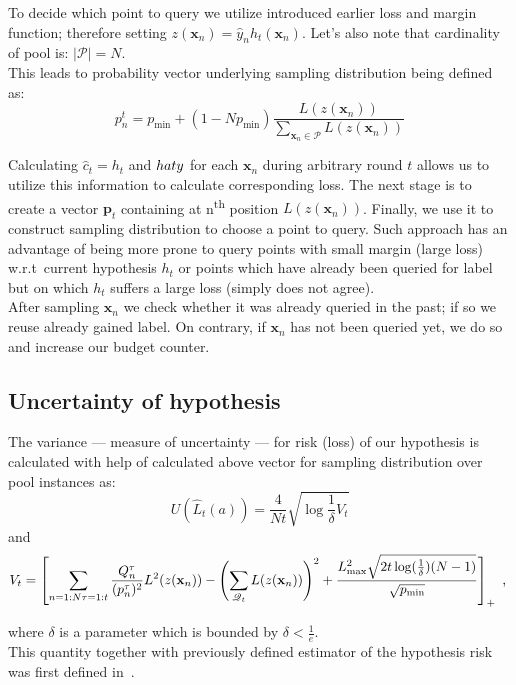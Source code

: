 \documentclass[12pt, a4paper, pdflatex]{report}
\newcommand{\ts}{\textsuperscript}
\begin{document}
To decide which point to query we utilize introduced earlier loss and margin function; therefore setting $z(\mathbf{x}_n) = \hat{y}_n h_t(\mathbf{x}_n)$. Let's also note that cardinality of pool is: $|\mathscr{P}| = N$.\\
This leads to probability vector underlying sampling distribution being defined as:
$$
p_n^t = p_{\text{min}} + (1-Np_{\text{min}}) \frac{L(z(\mathbf{x}_n))}{\sum_{\mathbf{x}_n \in \mathscr{P}} L(z(\mathbf{x}_n))}
$$

Calculating $\hat{c}_t = h_t$ and $\\hat{y}$ for each $\mathbf{x}_n$ during arbitrary round $t$ allows us to utilize this information to calculate corresponding loss. The next stage is to create a vector $\mathbf{p}_t$ containing at n\ts{th} position $L(z(\mathbf{x}_n))$. Finally, we use it to construct sampling distribution to choose a point to query. Such approach has an advantage of being more prone to query points with small margin (large loss) w.r.t\ current hypothesis $h_t$ or points which have already been queried for label but on which $h_t$ suffers a large loss (simply does not agree).\\

After sampling $\mathbf{x}_n$ we check whether it was already queried in the past; if so we reuse already gained label. On contrary, if $\mathbf{x}_n$ has not been queried yet, we do so and increase our budget counter.


\subsection{Uncertainty of hypothesis}
The variance --- measure of uncertainty --- for risk (loss) of our hypothesis is calculated with help of calculated above vector for sampling distribution over pool instances as:
$$
U(\hat{L}_t(a)) = \frac{4}{Nt} \sqrt{\log\frac{1}{\delta}V_t}
$$
and
$$
V_t = \left[
\sum_{n = 1:N \\ \tau = 1:t} \frac{Q^\tau_n}{(p^\tau_n)^2} L^2(z(\mathbf{x}_n))
-
\left( \sum_{\mathscr{Q}_t} L(z(\mathbf{x}_n)) \right)^2
+
\frac{L^2_{\text{max}}  \sqrt{2t \log(\frac{1}{\delta}) (N-1)} } {\sqrt{p_{\text{min}}}}
\right]_+ \text{~,~}
$$

where $\delta$ is a parameter which is bounded by $\delta < \frac{1}{e}$.\\

This quantity together with previously defined estimator of the hypothesis risk was first defined in~\cite{DBLP:journals/corr/GantiG13}.\\
\end{document}
